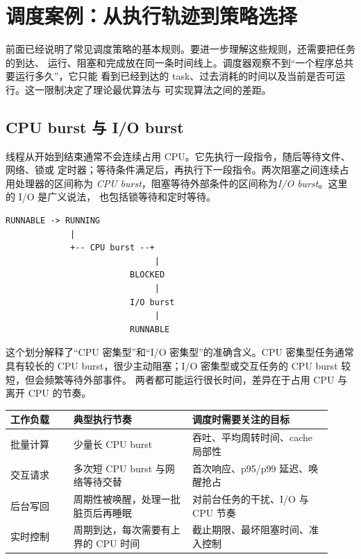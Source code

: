 \section{调度案例：从执行轨迹到策略选择}

前面已经说明了常见调度策略的基本规则。要进一步理解这些规则，还需要把任务的到达、
运行、阻塞和完成放在同一条时间线上。调度器观察不到“一个程序总共要运行多久”，它只能
看到已经到达的 task、过去消耗的时间以及当前是否可运行。这一限制决定了理论最优算法与
可实现算法之间的差距。

\subsection{CPU burst 与 I/O burst}

线程从开始到结束通常不会连续占用 CPU。它先执行一段指令，随后等待文件、网络、锁或
定时器；等待条件满足后，再执行下一段指令。两次阻塞之间连续占用处理器的区间称为
\emph{CPU burst}，阻塞等待外部条件的区间称为\emph{I/O burst}。这里的 I/O 是广义说法，
也包括锁等待和定时等待。

\begin{lstlisting}
RUNNABLE -> RUNNING
             |
             +-- CPU burst --+
                              |
                         BLOCKED
                              |
                         I/O burst
                              |
                         RUNNABLE
\end{lstlisting}

这个划分解释了“CPU 密集型”和“I/O 密集型”的准确含义。CPU 密集型任务通常具有较长的
CPU burst，很少主动阻塞；I/O 密集型或交互任务的 CPU burst 较短，但会频繁等待外部事件。
两者都可能运行很长时间，差异在于占用 CPU 与离开 CPU 的节奏。

\begin{longtable}{|L{0.18\linewidth}|L{0.34\linewidth}|L{0.4\linewidth}|}
\toprule
工作负载 & 典型执行节奏 & 调度时需要关注的目标 \\
\midrule
批量计算 & 少量长 CPU burst & 吞吐、平均周转时间、cache 局部性 \\\tablerowrule
交互请求 & 多次短 CPU burst 与网络等待交替 & 首次响应、p95/p99 延迟、唤醒抢占 \\\tablerowrule
后台写回 & 周期性被唤醒，处理一批脏页后再睡眠 & 对前台任务的干扰、I/O 与 CPU 节奏 \\\tablerowrule
实时控制 & 周期到达，每次需要有上界的 CPU 时间 & 截止期限、最坏阻塞时间、准入控制 \\
\bottomrule
\end{longtable}

